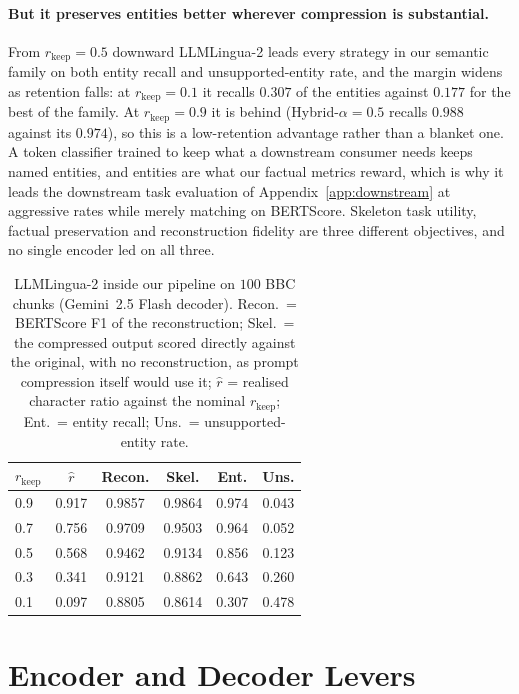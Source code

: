 \documentclass[11pt]{article}
\newcommand{\rkeep}{r_{\mathrm{keep}}}
\begin{document}
\paragraph{But it preserves entities better wherever compression is substantial.}
From $\rkeep = 0.5$ downward LLMLingua-2 leads every strategy in our semantic family on both entity
recall and unsupported-entity rate, and the margin widens as retention falls: at $\rkeep = 0.1$ it
recalls $0.307$ of the entities against $0.177$ for the best of the family. At $\rkeep = 0.9$ it is
behind (Hybrid-$\alpha{=}0.5$ recalls $0.988$ against its $0.974$), so this is a low-retention
advantage rather than a blanket one. A token classifier trained to keep what a downstream consumer
needs keeps named entities, and entities are what our factual metrics reward, which is why it leads
the downstream task evaluation of Appendix~\ref{app:downstream} at aggressive rates while merely
matching on BERTScore. Skeleton task utility, factual preservation and reconstruction fidelity are
three different objectives, and no single encoder led on all three.

\begin{table}[htbp]
\centering
\small
\setlength{\tabcolsep}{3.5pt}
\caption{LLMLingua-2 inside our pipeline on $100$ BBC chunks (Gemini~2.5 Flash decoder). Recon.\ =
BERTScore F1 of the reconstruction; Skel.\ = the compressed output scored directly against the original,
with no reconstruction, as prompt compression itself would use it; $\hat{r}$ = realised character ratio
against the nominal $\rkeep$; Ent.\ = entity recall; Uns.\ = unsupported-entity rate.}
\label{tab:llmlingua2}
\begin{tabular}{lccccc}
\toprule
$\rkeep$ & $\hat{r}$ & Recon. & Skel. & Ent. & Uns. \\
\midrule
0.9 & 0.917 & 0.9857 & 0.9864 & 0.974 & 0.043 \\
0.7 & 0.756 & 0.9709 & 0.9503 & 0.964 & 0.052 \\
0.5 & 0.568 & 0.9462 & 0.9134 & 0.856 & 0.123 \\
0.3 & 0.341 & 0.9121 & 0.8862 & 0.643 & 0.260 \\
0.1 & 0.097 & 0.8805 & 0.8614 & 0.307 & 0.478 \\
\bottomrule
\end{tabular}
\end{table}

\section{Encoder and Decoder Levers}
\label{app:levers}
\end{document}
